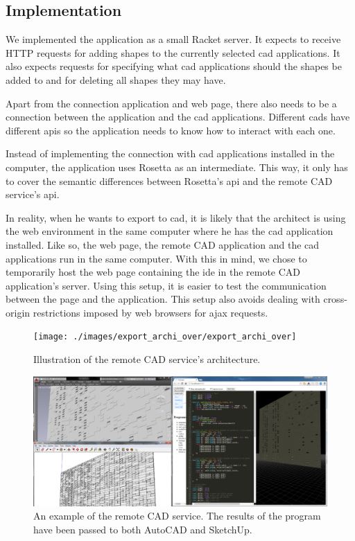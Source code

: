 \subsection{Implementation}
We implemented the application as a small Racket server.
It expects to receive HTTP requests for adding shapes to the currently selected \gls{cad} applications.
It also expects requests for specifying what \gls{cad} applications should the shapes be added to and for deleting all shapes they may have.

Apart from the connection application and web page, there also needs to be a connection between the application and the \gls{cad} applications.
Different \glspl{cad} have different \glspl{api} so the application needs to know how to interact with each one.

Instead of implementing the connection with \gls{cad} applications installed in the computer, the application uses Rosetta as an intermediate.
This way, it only has to cover the semantic differences between Rosetta's \gls{api} and the remote CAD service's \gls{api}.

In reality, when he wants to export to \gls{cad}, it is likely that the architect is using the web environment in the same computer where he has the \gls{cad} application installed.
Like so, the web page, the remote CAD application and the \gls{cad} applications run in the same computer.
With this in mind, we chose to temporarily host the web page containing the \gls{ide} in the remote CAD application's server.
Using this setup, it is easier to test the communication between the page and the application.
This setup also avoids dealing with cross-origin restrictions imposed by web browsers for \gls{ajax} requests.

\begin{figure}
  \centering
  \texttt{[image: ./images/export\_archi\_over/export\_archi\_over]}
  \caption{Illustration of the remote CAD service's architecture.}
  \label{fig:remote:cad:archi}
\end{figure}


\begin{figure}
  \centering
  \includegraphics[width=1.0\textwidth]{./images/remote_cad_example/remote_cad_example}
  \caption[An example of the remote CAD service.]{An example of the remote CAD service. The results of the program have been passed to both AutoCAD and SketchUp.}
  \label{fig:remote:cad:example}
\end{figure}


